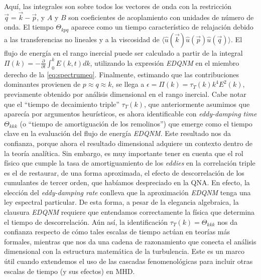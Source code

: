 Aquí, las integrales son sobre todos los vectores de onda con la
restricción $\vec{q} = \vec{k} - \vec{p}$, y $A$ y $B$ son
coeficientes de acoplamiento con unidades de número de onda.  El
tiempo $\Theta_{kpq}$ aparece como un tiempo característico de
relajación debido a las transferencias no lineales y a la viscosidad
de $\langle \hat{u}(\vec{k}) \hat{u}(\vec{p}) \hat{u}(\vec{q})
\rangle$.  El flujo de energía en el rango inercial puede ser
calculado a partir de la integral $\Pi(k) = -\frac{\partial}{\partial
  t} \int_0^k E(k, t) dk$, utilizando la expresión \textit{EDQNM} en
el miembro derecho de la \cref{eq:spectrumeq}. Finalmente, estimando
que las contribuciones dominantes provienen de $p \approx q \approx
k$, se llega a $\epsilon = \Pi(k) = \tau_T(k) k^4 E^2(k)$, previamente
obtenido por análisis dimensional en el rango inercial. Cabe notar que
el ``tiempo de decaimiento triple'' $\tau_T(k)$, que anteriormente
asumimos que aparecía por argumentos heurísticos, es ahora
identificable con \textit{eddy-damping time} $\Theta_{kkk}$ (o
``tiempo de amortiguación de los remolinos'') que emerge como el
tiempo clave en la evaluación del flujo de energía
\textit{EDQNM}. Este resultado nos da confianza, porque ahora el
resultado dimensional adquiere un contexto dentro de la teoría
analítica. Sin embargo, es muy importante tener en cuenta que el rol
físico que cumple la tasa de amortiguamiento de los \textit{eddies} en
la correlación triple es el de restaurar, de una forma aproximada, el
efecto de descorrelación de los cumulantes de tercer orden, que
habíamos despreciado en la QNA. En efecto, la elección del
\textit{eddy-damping rate} conlleva que la aproximación \textit{EDQNM}
tenga una ley espectral particular. De esta forma, a pesar de la
elegancia algebraica, la clausura \textit{EDQNM} requiere que
entendamos correctamente la física que determina el tiempo de
descorrelación. Aún así, la identificación $\tau_T(k) = \Theta_{kkk}$
nos da confianza respecto de cómo tales escalas de tiempo actúan en
teorías más formales, mientras que nos da una cadena de razonamiento
que conecta el análisis dimensional con la estructura matemática de la
turbulencia. Este es un marco útil cuando extendemos el uso de las
cascadas fenomenológicas para incluir otras escalas de tiempo (y sus
efectos) en MHD.


